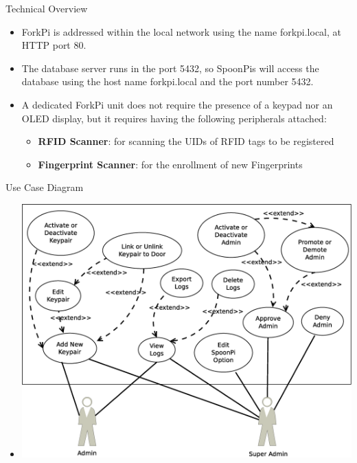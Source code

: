 \begin{frame}{Technical Overview}
\begin{itemize}
    \item<1-> ForkPi is addressed within the local network using the name forkpi.local, at HTTP port 80.
    \item<2-> The database server runs in the port 5432, so SpoonPis will access the database using the host name forkpi.local and the port number 5432.
    \item<3-> A dedicated ForkPi unit does not require the presence of a keypad nor an OLED display, but it requires having the following peripherals attached:
    \begin{itemize}
    	\item<4-> \textbf{RFID Scanner}: for scanning the UIDs of RFID tags to be registered
		\item<5-> \textbf{Fingerprint Scanner}: for the enrollment of new Fingerprints
    \end{itemize}
\end{itemize}
\end{frame}

\begin{frame}{Use Case Diagram}
\begin{itemize}
    \item<1-> \includegraphics[scale=0.3]{forkpi-use-case.eps}
\end{itemize}
\end{frame}

